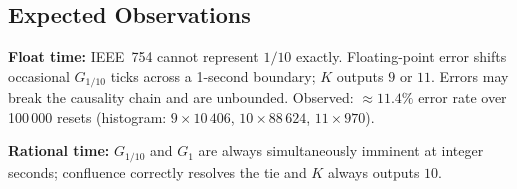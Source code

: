 \subsection*{Expected Observations}

\textbf{Float time:} IEEE~754 cannot represent $1/10$ exactly.
Floating-point error shifts occasional $G_{1/10}$ ticks across a
1-second boundary; $K$ outputs $9$ or $11$.  Errors may break the
causality chain and are unbounded.
Observed: ${\approx}11.4\%$ error rate over 100\,000 resets
(histogram: $9 \times 10\,406$, $10 \times 88\,624$, $11 \times 970$).

\textbf{Rational time:} $G_{1/10}$ and $G_1$ are always simultaneously
imminent at integer seconds; confluence correctly resolves the tie and
$K$ always outputs $10$.
